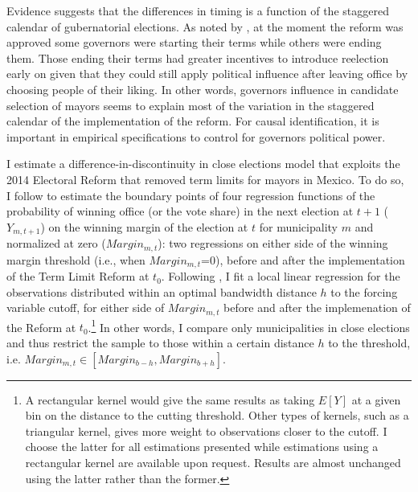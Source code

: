 \documentclass[12pt]{amsart}
\makeatletter
\def\subsection{\@startsection{subsection}{2}
	\z@{.8\linespacing\@plus.7\linespacing}{.7\linespacing}{\large}}
\numberwithin{equation}{section}
\theoremstyle{definition}
\theoremstyle{definition}
\theoremstyle{definition}
\makeatother
\begin{document}
Evidence suggests that the differences in timing is a function of the staggered calendar of gubernatorial elections. As noted by \citet{motolinia_2020}, at the moment the reform was approved some governors were starting their terms while others were ending them. Those ending their terms had greater incentives to introduce reelection early on given that they could still apply political influence after leaving office by choosing people of their liking. In other words, governors influence in candidate selection of mayors seems to explain most of the variation in the staggered calendar of the implementation of the reform. For causal identification, it is important in empirical specifications to control for governors political power. 

\subsection{Empirical Specification} 

I estimate  a difference-in-discontinuity in close elections model that exploits the 2014 Electoral Reform that removed term limits for mayors in Mexico. To do so, I follow \citet{grembi_etal_2017} to estimate the boundary points of four regression functions of the probability of winning office (or the vote share) in the next election at $t+1$ ($Y_{m,t+1}$) on the winning margin of the election at $t$ for municipality $m$ and normalized at zero ($Margin_{m,t}$): two regressions on either side of the winning margin threshold (i.e., when $Margin_{m,t}$=0), before and after the implementation of the Term Limit Reform at $t_0$. Following \citet{gelman_imbens2014}, I fit a local linear regression for the observations distributed within an  \citet{calonicoetal_2014} optimal bandwidth distance $h$ to the forcing variable cutoff, for either side of $Margin_{m,t}$ before and after the implemenation of the Reform at $t_0$.\footnote{A rectangular kernel would give the same results as taking $E[Y]$ at a given bin on the distance to the cutting threshold. Other types of kernels, such as a triangular kernel, gives more weight to observations closer to the cutoff. I choose the latter for all estimations presented while estimations using a rectangular kernel are available upon request. Results are almost unchanged using the latter rather than the former.} In other words, I compare only municipalities in close elections and thus restrict the sample to those within a certain distance $h$ to the threshold, i.e. $Margin_{m,t} \in [Margin_{b-h}, Margin_{b+h}]$.  
\end{document}
